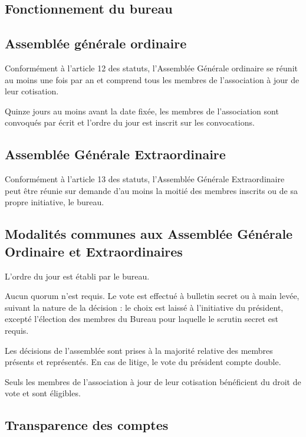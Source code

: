 \documentclass[a4paper,french,10pt]{article}
\begin{document}
\subsection{Fonctionnement du bureau}

\subsection{Assemblée générale ordinaire}
Conformément à l'article 12 des statuts, l’Assemblée Générale ordinaire se réunit au moins une fois par an et comprend tous les membres de l’association à jour de leur cotisation.

Quinze jours au moins avant la date fixée, les membres de l’association sont convoqués par écrit et l’ordre du jour est inscrit sur les convocations.

\subsection{Assemblée Générale Extraordinaire}
\label{sec:age}
Conformément à l'article 13 des statuts, l'Assemblée Générale Extraordinaire peut être réunie sur demande d'au moins la moitié des membres inscrits ou de sa propre initiative, le bureau.
\subsection{Modalités communes aux Assemblée Générale Ordinaire et Extraordinaires}
\label{sec:ag}
L'ordre du jour est établi par le bureau. %

Aucun quorum n'est requis. Le vote est effectué à bulletin secret ou à
main levée, suivant la nature de la décision : le choix est laissé à
l'initiative du président, excepté l'élection des membres du Bureau
pour laquelle le scrutin secret est requis.

Les décisions de l’assemblée sont prises à la majorité relative des
membres présents et représentés. En cas de litige, le vote du
président compte double.

Seuls les membres de l’association à jour de leur cotisation
bénéficient du droit de vote et sont éligibles.
\subsection{Transparence des comptes}
\label{sec:transp-des-compt}
\end{document}
